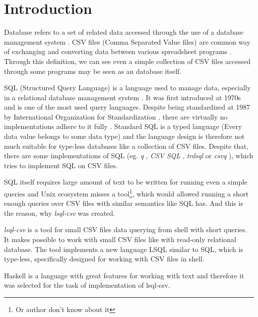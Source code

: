 \chapter*{Introduction}

Database refers to a set of related data accessed through the use of a database management system \cite{enwiki-database}.
CSV files (Comma Separated Value files) are common way of exchanging and converting data between various spreadsheet programs \cite{rfc4180}.
Through this definition, we can see even a simple collection of CSV files accessed through some programs may be seen as an database itself.


SQL (Structured Query Language) is a language used to manage data, especially in a relational database management system \cite{enwiki-sql}.
It was first introduced at 1970s \cite{enwiki-sql} and is one of the most used query languages. 
Despite being standardized at 1987 by International Organization for Standardization \cite{ISO9075-1987}, 
there are virtually no implementations adhere to it fully \cite{enwiki-sql}.
Standard SQL is a typed language (Every data value belongs to some data type) \cite{ISO9075-2023} and the language
design is therefore not much suitable for type-less databases like a collection of CSV files.
Despite that, there are some implementations of SQL (eg. \textit{q} \cite{q}, \textit{CSV SQL} \cite{csv-sql}, \textit{trdsql} \cite{trdsql} or \textit{csvq} \cite{csvq}), which tries to implement SQL on CSV files.

SQL itself requires large amount of text to be written for running even a simple queries and Unix ecosystem misses a tool\footnote{Or author don't know about it}, 
which would allowed running a short enough queries over CSV files with similar semantics like SQL has. And this is the reason, why \textit{lsql-csv} was created.

\textit{lsql-csv} is a tool for small CSV files data querying from shell with short queries. It makes possible to work with small CSV files like with read-only relational database.
The tool implements a new language LSQL similar to SQL, which is type-less, specifically designed for working with CSV files in shell.

Haskell is a language with great features for working with text \cite{practical-haskell} and therefore it was selected for the task of implementation of lsql-csv.
